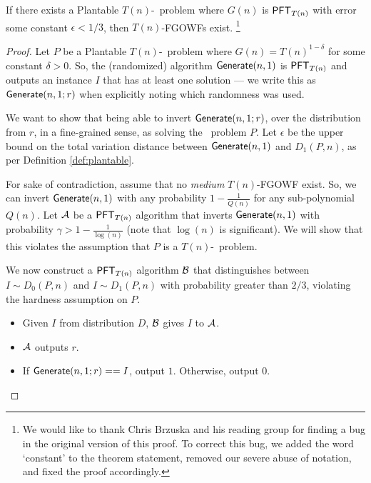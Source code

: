 \begin{theorem}\label{thm:FGOWFs-exist}	%
	If there exists a Plantable $T(n)$-\ACIH~problem where $G(n)$ is $\mathsf{PFT}_{T(n)}$ with error some constant $\epsilon < 1/3$, then $T(n)$-FGOWFs exist.
	\footnote{We would like to thank Chris Brzuska and his reading group for finding a bug in the original version of this proof. To correct this bug, we added the word `constant' to the theorem statement, removed our severe abuse of notation, and fixed the proof accordingly.}
\end{theorem}
\begin{proof}
	Let $P$ be a Plantable $T(n)$-\ACIH~problem where $G(n) = T(n)^{1-\delta}$ for some constant $\delta>0$. So, the (randomized) algorithm $\mathsf{Generate}(n,1)$ is $\mathsf{PFT}_{T(n)}$ and outputs an instance $I$ that has at least one solution --- we write this as $\mathsf{Generate}(n,1; r)$ when explicitly noting which randomness was used.
	
	We want to show that being able to invert $\mathsf{Generate}(n,1; r)$, over the distribution from $r$, in a fine-grained sense, as solving the \ACIH~problem $P$. Let $\epsilon$ be the upper bound on the total variation distance between $\mathsf{Generate}(n,1)$ and $D_1(P,n)$, as per Definition \ref{def:plantable}.
	
	For sake of contradiction, assume that no \emph{medium} $T(n)$-FGOWF exist. So, we can invert $\mathsf{Generate}(n,1)$ with any probability $1 - \frac 1 {Q(n)}$ for any sub-polynomial $Q(n)$. Let $\mathcal{A}$ be a $\mathsf{PFT}_{T(n)}$ algorithm that inverts $\mathsf{Generate}(n,1)$ with probability $\gamma > 1 - \frac{1}{\log(n)}$ (note that $\log(n)$ is significant). We will show that this violates the assumption that $P$ is a $T(n)$-\ACIH~problem.
	
	We now construct a $\mathsf{PFT}_{T(n)}$ algorithm ${\cal B}$ that distinguishes between $I \sim D_0(P,n)$ and $I \sim D_1(P,n)$ with probability greater than $2/3$, violating the hardness assumption on $P$.
	\begin{itemize}
		\item Given $I$ from distribution $D$, ${\cal B}$ gives $I$ to $\mathcal{A}$.
		\item $\mathcal{A}$ outputs $r$.
		\item If $\mathsf{Generate}(n,1;r) == I$, output $1$. Otherwise, output $0$.
	\end{itemize}
	

\end{proof}
